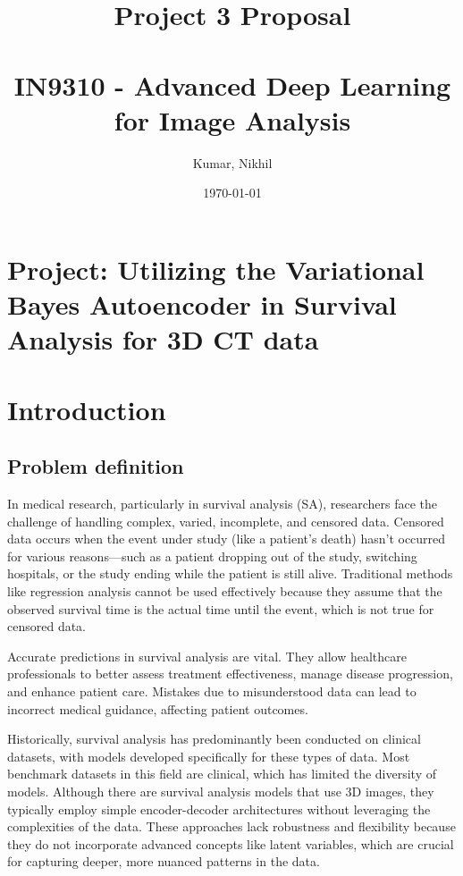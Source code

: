 \documentclass{article}
\title{Project 3 Proposal  \\ \ \\IN9310 - Advanced Deep Learning for Image Analysis
}
\author{Kumar, Nikhil}
\date{\today}
\begin{document}
\maketitle


\section*{Project: Utilizing the Variational Bayes Autoencoder in Survival Analysis for 3D CT data}


\section{Introduction}
\subsection{Problem definition}
In medical research, particularly in survival analysis (SA), researchers face the challenge of handling complex, varied, incomplete, and censored data. Censored data occurs when the event under study (like a patient's death) hasn't occurred for various reasons—such as a patient dropping out of the study, switching hospitals, or the study ending while the patient is still alive. Traditional methods like regression analysis cannot be used effectively because they assume that the observed survival time is the actual time until the event, which is not true for censored data.   

Accurate predictions in survival analysis are vital. They allow healthcare professionals to better assess treatment effectiveness, manage disease progression, and enhance patient care. Mistakes due to misunderstood data can lead to incorrect medical guidance, affecting patient outcomes.

Historically, survival analysis has predominantly been conducted on clinical datasets, with models developed specifically for these types of data. Most benchmark datasets in this field are clinical, which has limited the diversity of models. Although there are survival analysis models that use 3D images, they typically employ simple encoder-decoder architectures without leveraging the complexities of the data. These approaches lack robustness and flexibility because they do not incorporate advanced concepts like latent variables, which are crucial for capturing deeper, more nuanced patterns in the data. 
\end{document}
